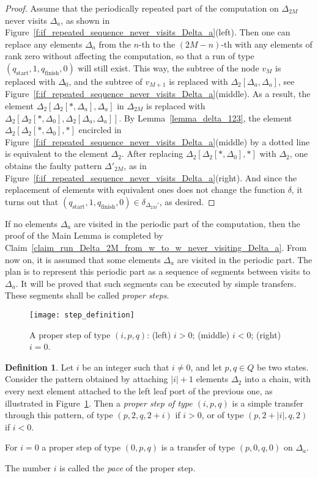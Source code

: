 \documentclass[12pt,a4paper]{article}
\theoremstyle{definition}
\newtheorem{definition}{Definition}
\begin{document}
\begin{proof}
Assume that the periodically repeated part of the computation on $\Delta_{2M}$ never visits $\Delta_a$,
as shown in Figure~\ref{f:if_repeated_sequence_never_visits_Delta_a}(left).
Then one can replace any elements $\Delta_a$ from the $n$-th to the $(2M-n)$-th
with any elements of rank zero
without affecting the computation,
so that a run of type $(q_{\text{start}},1,q_{\text{finish}},0)$ will still exist.
This way, the subtree of the node $v_M$ is replaced with $\Delta_0$,
and the subtree of $v_{M+1}$ is replaced with $\Delta_2[\Delta_a,\Delta_a]$,
see Figure~\ref{f:if_repeated_sequence_never_visits_Delta_a}(middle).
As a result, the element $\Delta_2[\Delta_2[*,\Delta_a],\Delta_a]$ in $\Delta_{2M}$
is replaced with $\Delta_2[\Delta_2[*,\Delta_0],\Delta_2[\Delta_a,\Delta_a]]$.
By Lemma~\ref{lemma_delta_123}, the element $\Delta_2[\Delta_2[*,\Delta_0],*]$
encircled in Figure~\ref{f:if_repeated_sequence_never_visits_Delta_a}(middle) by a dotted line
is equivalent to the element $\Delta_2$.
After replacing $\Delta_2[\Delta_2[*,\Delta_0],*]$ with $\Delta_2$,
one obtains the faulty pattern $\Delta'_{2M}$,
as in Figure~\ref{f:if_repeated_sequence_never_visits_Delta_a}(right).
And since the replacement of elements with equivalent ones
does not change the function $\delta$,
it turns out that $(q_{\text{start}},1,q_{\text{finish}},0) \in \delta_{\Delta_{2M}'}$,
as desired.
\end{proof}

If no elements $\Delta_a$ are visited in the periodic part of the computation, 
then the proof of the Main Lemma is completed 
by Claim~\ref{claim_run_Delta_2M_from_w_to_w_never_visiting_Delta_a}. 
From now on, it is assumed that some elements $\Delta_a$ are visited in the periodic part.
The plan is to represent this periodic part
as a sequence of segments between visits to $\Delta_a$.
It will be proved that such segments
can be executed by simple transfers.
These segments shall be called \emph{proper steps}.

\begin{figure}[t]
	\centerline{\texttt{[image: step\_definition]}}
	\caption{A proper step of type $(i, p, q)$:
		(left) $i>0$; (middle) $i<0$; (right) $i=0$.}
	\label{f:step_definition}
\end{figure}

\begin{definition}\label{definition_step}
Let $i$ be an integer 
such that $i \neq 0$,
and let $p,q \in Q$ be two states.
Consider the pattern obtained by attaching $|i|+1$ elements $\Delta_2$ into a chain,
with every next element attached to the left leaf port of the previous one,
as illustrated in Figure~\ref{f:step_definition}.
Then a \emph{proper step of type $(i,p,q)$}
is a simple transfer through this pattern,
of type $(p, 2, q, 2+i)$ if $i>0$,
or of type $(p, 2+|i|, q, 2)$ if $i<0$.

For $i=0$ a proper step of type $(0,p,q)$
is a transfer of type $(p, 0, q, 0)$ on $\Delta_a$.

The number $i$ is called the \emph{pace} of the proper step.
\end{definition}
\end{document}
